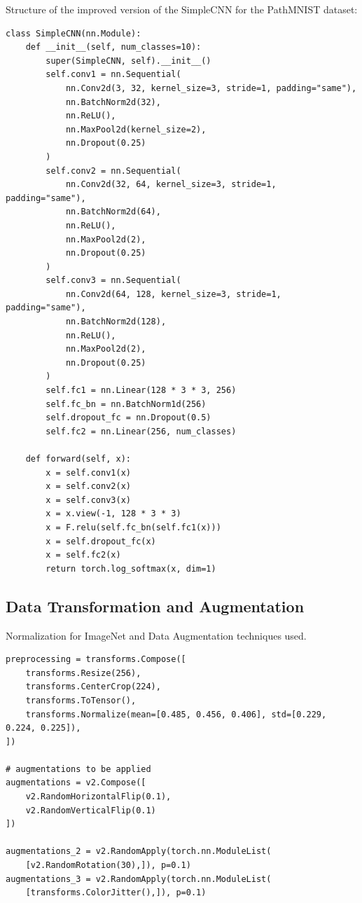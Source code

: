 Structure of the improved version of the SimpleCNN for the PathMNIST dataset:\@

\begin{verbatim}
class SimpleCNN(nn.Module):
    def __init__(self, num_classes=10):
        super(SimpleCNN, self).__init__()
        self.conv1 = nn.Sequential(
            nn.Conv2d(3, 32, kernel_size=3, stride=1, padding="same"),
            nn.BatchNorm2d(32),
            nn.ReLU(),
            nn.MaxPool2d(kernel_size=2),
            nn.Dropout(0.25)
        )
        self.conv2 = nn.Sequential(
            nn.Conv2d(32, 64, kernel_size=3, stride=1, padding="same"),
            nn.BatchNorm2d(64),
            nn.ReLU(),
            nn.MaxPool2d(2),
            nn.Dropout(0.25)
        )
        self.conv3 = nn.Sequential(
            nn.Conv2d(64, 128, kernel_size=3, stride=1, padding="same"),
            nn.BatchNorm2d(128),
            nn.ReLU(),
            nn.MaxPool2d(2),
            nn.Dropout(0.25)
        )
        self.fc1 = nn.Linear(128 * 3 * 3, 256)
        self.fc_bn = nn.BatchNorm1d(256)
        self.dropout_fc = nn.Dropout(0.5)
        self.fc2 = nn.Linear(256, num_classes)

    def forward(self, x):
        x = self.conv1(x)
        x = self.conv2(x)
        x = self.conv3(x)
        x = x.view(-1, 128 * 3 * 3)
        x = F.relu(self.fc_bn(self.fc1(x)))
        x = self.dropout_fc(x)
        x = self.fc2(x)
        return torch.log_softmax(x, dim=1)
\end{verbatim}


\subsection{Data Transformation and Augmentation}\label{training_transformation}

Normalization for ImageNet and Data Augmentation techniques used.

\begin{verbatim}
preprocessing = transforms.Compose([
    transforms.Resize(256),
    transforms.CenterCrop(224),
    transforms.ToTensor(),
    transforms.Normalize(mean=[0.485, 0.456, 0.406], std=[0.229, 0.224, 0.225]),
])
 
# augmentations to be applied
augmentations = v2.Compose([
    v2.RandomHorizontalFlip(0.1),
    v2.RandomVerticalFlip(0.1)
])

augmentations_2 = v2.RandomApply(torch.nn.ModuleList(
    [v2.RandomRotation(30),]), p=0.1)
augmentations_3 = v2.RandomApply(torch.nn.ModuleList(
    [transforms.ColorJitter(),]), p=0.1)

\end{verbatim}

